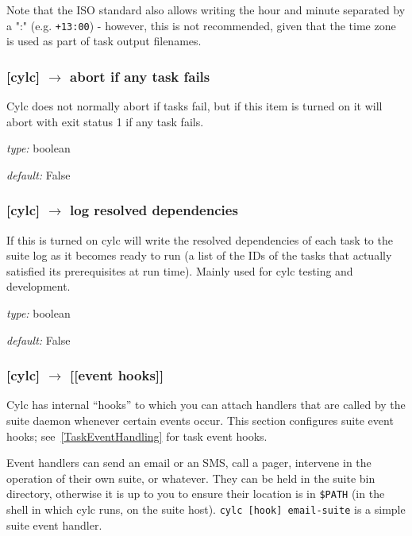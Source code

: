 Note that the ISO standard also allows writing the hour and minute separated
by a ":" (e.g. \lstinline=+13:00=) - however, this is not recommended, given
that the time zone is used as part of task output filenames.

\subsubsection[abort if any task fails]{[cylc] $\rightarrow$ abort if any task fails}

Cylc does not normally abort if tasks fail, but if this item is turned
on it will abort with exit status 1 if any task fails.

\begin{myitemize}
    \item {\em type:} boolean
    \item {\em default:} False
\end{myitemize}

\subsubsection[log resolved dependencies]{[cylc] $\rightarrow$ log resolved dependencies}

If this is turned on cylc will write the resolved dependencies of each
task to the suite log as it becomes ready to run (a list of the IDs of
the tasks that actually satisfied its prerequisites at run time). Mainly
used for cylc testing and development.

\begin{myitemize}
    \item {\em type:} boolean
    \item {\em default:} False
\end{myitemize}

\subsubsection[{[[}event hooks{]]}]{[cylc] $\rightarrow$ [[event hooks]]}
\label{SuiteEventHandling}

Cylc has internal ``hooks'' to which you can attach handlers that are
called by the suite daemon whenever certain events occur. This section
configures suite event hooks; see~\ref{TaskEventHandling} for
task event hooks.

Event handlers can send an email or an SMS, call a pager, intervene in
the operation of their own suite, or whatever.
They can be held in the suite bin directory, otherwise it is up to you
to ensure their location is in \lstinline=$PATH= (in the shell in which
cylc runs, on the suite host).
\lstinline=cylc [hook] email-suite= is a simple suite event handler.

